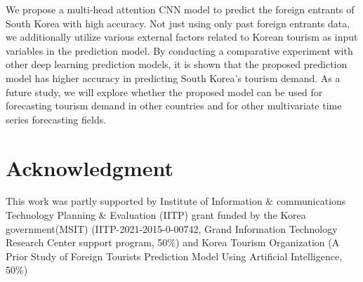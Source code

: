 \documentclass[conference]{IEEEtran}
\begin{document}
We propose a multi-head attention CNN model to predict the foreign entrants of South Korea with high accuracy. Not just using only past foreign entrants data, we additionally utilize various external factors related to Korean tourism as input variables in the prediction model. By conducting a comparative experiment with other deep learning prediction models, it is shown that the proposed prediction model has higher accuracy in predicting South Korea’s tourism demand.
As a future study, we will explore whether the proposed model can be used for forecasting tourism demand in other countries and for other multivariate time series forecasting fields.


\section*{Acknowledgment}
This work was partly supported by Institute of Information \& communications Technology Planning \& Evaluation (IITP) grant funded by the Korea government(MSIT) (IITP-2021-2015-0-00742, Grand Information Technology Research Center support program, 50\%) and Korea Tourism Organization (A Prior Study of Foreign Tourists Prediction Model Using Artificial Intelligence, 50\%)



\end{document}
